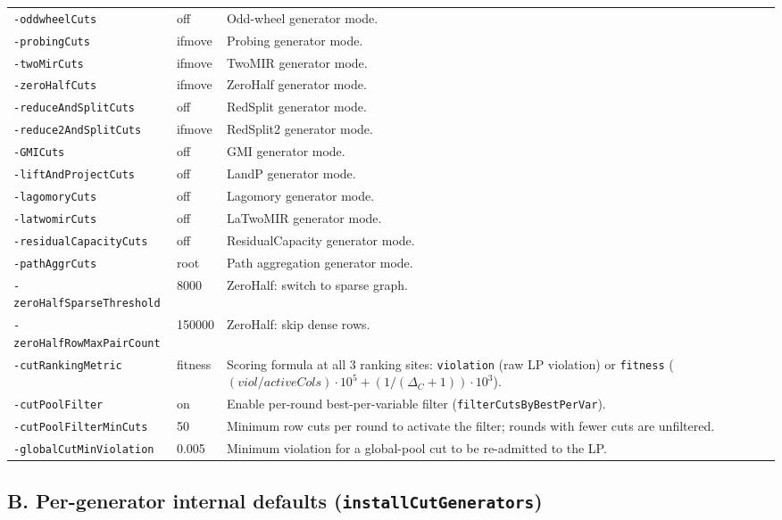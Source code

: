 \documentclass[11pt,a4paper]{article}
\begin{document}
\begin{longtable}{p{4.0cm}p{2.0cm}p{8.5cm}}
\texttt{-oddwheelCuts}       & off       & Odd-wheel generator mode.\\
\texttt{-probingCuts}        & ifmove    & Probing generator mode.\\
\texttt{-twoMirCuts}         & ifmove    & TwoMIR generator mode.\\
\texttt{-zeroHalfCuts}       & ifmove    & ZeroHalf generator mode.\\
\texttt{-reduceAndSplitCuts} & off       & RedSplit generator mode.\\
\texttt{-reduce2AndSplitCuts}& ifmove    & RedSplit2 generator mode.\\
\texttt{-GMICuts}            & off       & GMI generator mode.\\
\texttt{-liftAndProjectCuts} & off       & LandP generator mode.\\
\texttt{-lagomoryCuts}       & off       & Lagomory generator mode.\\
\texttt{-latwomirCuts}       & off       & LaTwoMIR generator mode.\\
\texttt{-residualCapacityCuts}& off      & ResidualCapacity generator mode.\\
\texttt{-pathAggrCuts}       & root      & Path aggregation generator mode.\\
\texttt{-zeroHalfSparseThreshold}& 8000  & ZeroHalf: switch to sparse graph.\\
\texttt{-zeroHalfRowMaxPairCount}& 150000& ZeroHalf: skip dense rows.\\
\texttt{-cutRankingMetric}      & fitness& Scoring formula at all 3 ranking
  sites: \texttt{violation} (raw LP violation) or \texttt{fitness}
  ($(viol/activeCols)\cdot10^5 + (1/(\Delta_C+1))\cdot10^3$).\\
\texttt{-cutPoolFilter}         & on    & Enable per-round
  best-per-variable filter (\texttt{filterCutsByBestPerVar}).\\
\texttt{-cutPoolFilterMinCuts}  & 50    & Minimum row cuts per round
  to activate the filter; rounds with fewer cuts are unfiltered.\\
\texttt{-globalCutMinViolation} & 0.005 & Minimum violation for a
  global-pool cut to be re-admitted to the LP.\\
\bottomrule
\end{longtable}

\subsection*{B. Per-generator internal defaults
             (\texttt{installCutGenerators})}
\end{document}
